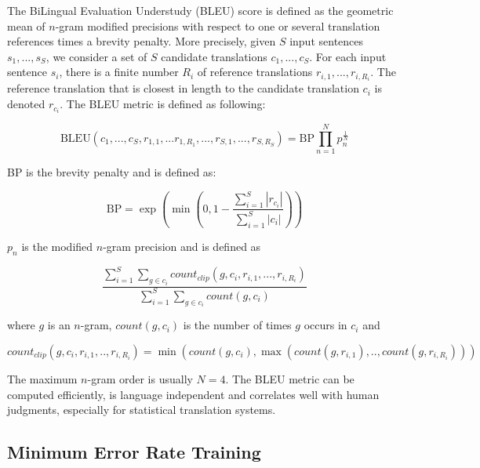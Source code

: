     The BiLingual Evaluation Understudy (BLEU) score \cite{papineni-roukos-ward-zhu:2002:ACL} is defined as 
    the geometric mean of $n$-gram modified precisions with respect
    to one or several translation references times a brevity penalty. More precisely, given $S$ input sentences
    $s_1,...,s_S$, we consider a set of $S$ candidate translations $c_1,...,c_S$. For each input sentence $s_i$, there is
    a finite number $R_i$ of reference translations $r_{i,1},...,r_{i,R_i}$. The reference translation
    that is closest in length to the candidate translation $c_i$ is denoted $r_{c_i}$. The BLEU metric is defined as following:

    \begin{equation}
      \mbox{BLEU}(c_1,...,c_S,r_{1,1},...r_{1,R_1},...,r_{S,1},...,r_{S,R_S}) = \mbox{BP} \prod_{n=1}^N p_n^{\frac{1}{N}}
    \end{equation}

    \noindent BP is the brevity penalty and is defined as:

    \begin{equation}
      \mbox{BP} = \exp(\min(0,1-\frac{\sum_{i=1}^S |r_{c_i}|}{\sum_{i=1}^S |c_i|}))
    \end{equation}

    \noindent $p_n$ is the modified $n$-gram precision and is defined as

    \begin{equation}
      \frac{\sum_{i=1}^S \sum_{g \in c_i} count_{clip}(g,c_i,r_{i,1},...,r_{i,R_i})}{\sum_{i=1}^S \sum_{g \in c_i} count(g,c_i)}
    \end{equation}

    \noindent where $g$ is an $n$-gram, $count(g,c_i)$ is the number of times $g$ occurs in $c_i$ and 
    
    \begin{equation}
      count_{clip}(g,c_i,r_{i,1},..,r_{i,R_i}) = \min(count(g,c_i),\max(count(g,r_{i,1}),..,count(g,r_{i,R_i})))
    \end{equation}

    The maximum $n$-gram order is usually $N=4$. The BLEU metric can be computed efficiently, is language
    independent and correlates well with human judgments, especially for statistical translation systems.

    \subsection{Minimum Error Rate Training}
    \label{sec:mert}

